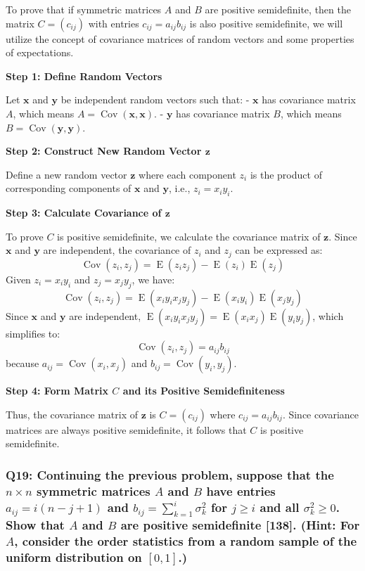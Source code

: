 \documentclass[8pt]{article}
\begin{document}
To prove that if symmetric matrices \(A\) and \(B\) are positive semidefinite, then the matrix \(C = (c_{ij})\) with entries \(c_{ij} = a_{ij} b_{ij}\) is also positive semidefinite, we will utilize the concept of covariance matrices of random vectors and some properties of expectations.

\textbf{Step 1: Define Random Vectors}

Let \(\mathbf{x}\) and \(\mathbf{y}\) be independent random vectors such that:
- \(\mathbf{x}\) has covariance matrix \(A\), which means \(A = \operatorname{Cov}(\mathbf{x}, \mathbf{x})\).
- \(\mathbf{y}\) has covariance matrix \(B\), which means \(B = \operatorname{Cov}(\mathbf{y}, \mathbf{y})\).

\textbf{Step 2: Construct New Random Vector \(\mathbf{z}\)}

Define a new random vector \(\mathbf{z}\) where each component \(z_i\) is the product of corresponding components of \(\mathbf{x}\) and \(\mathbf{y}\), i.e., \(z_i = x_i y_i\). 

\textbf{Step 3: Calculate Covariance of \(\mathbf{z}\)}

To prove \(C\) is positive semidefinite, we calculate the covariance matrix of \(\mathbf{z}\). Since \(\mathbf{x}\) and \(\mathbf{y}\) are independent, the covariance of \(z_i\) and \(z_j\) can be expressed as:
\[
\operatorname{Cov}(z_i, z_j) = \operatorname{E}(z_i z_j) - \operatorname{E}(z_i) \operatorname{E}(z_j)
\]
Given \(z_i = x_i y_i\) and \(z_j = x_j y_j\), we have:
\[
\operatorname{Cov}(z_i, z_j) = \operatorname{E}(x_i y_i x_j y_j) - \operatorname{E}(x_i y_i) \operatorname{E}(x_j y_j)
\]
Since \(\mathbf{x}\) and \(\mathbf{y}\) are independent, \(\operatorname{E}(x_i y_i x_j y_j) = \operatorname{E}(x_i x_j) \operatorname{E}(y_i y_j)\), which simplifies to:
\[
\operatorname{Cov}(z_i, z_j) = a_{ij} b_{ij}
\]
because \(a_{ij} = \operatorname{Cov}(x_i, x_j)\) and \(b_{ij} = \operatorname{Cov}(y_i, y_j)\).

\textbf{Step 4: Form Matrix \(C\) and its Positive Semidefiniteness}

Thus, the covariance matrix of \(\mathbf{z}\) is \(C = (c_{ij})\) where \(c_{ij} = a_{ij} b_{ij}\). Since covariance matrices are always positive semidefinite, it follows that \(C\) is positive semidefinite.


\subsubsection*{Q19: Continuing the previous problem, suppose that the \(n \times n\) symmetric matrices \(A\) and \(B\) have entries \(a_{ij} = i(n - j + 1)\) and \(b_{ij} = \sum_{k=1}^i \sigma_k^2\) for \(j \geq i\) and all \(\sigma_k^2 \geq 0\). Show that \(A\) and \(B\) are positive semidefinite [138]. (Hint: For \(A\), consider the order statistics from a random sample of the uniform distribution on \([0, 1]\).)}
\end{document}
